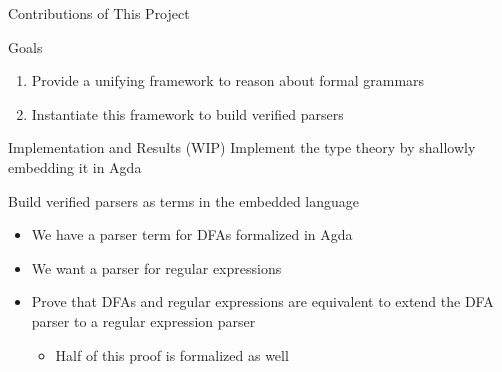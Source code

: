 \documentclass[10pt]{beamer}
\makeatletter
\newif\ifdraft
\newcommand{\todoin}[1]{\ifdraft{\todo[inline]{TODO:\@ #1}}\fi}
\makeatother
\begin{document}
\begin{frame}{Contributions of This Project}
  \begin{alertblock}{Goals}
    \begin{enumerate}
       \item<1-> Provide a unifying framework to reason about formal grammars
       \item<2-> Instantiate this framework to build verified parsers
    \end{enumerate}
  \end{alertblock}


\end{frame}

\begin{frame}{Implementation and Results (WIP)}
  Implement the type theory by shallowly embedding it in Agda

  Build verified parsers as terms in the embedded language

  \begin{itemize}
    \item<+-> We have a parser term for DFAs formalized in Agda
    \item<+-> We want a parser for regular expressions
    \item<+-> Prove that DFAs and regular expressions are equivalent to extend the DFA parser to a regular expression parser
        \begin{itemize}
            \item Half of this proof is formalized as well
        \end{itemize}
  \end{itemize}
  \todoin{Rephrase this slide to sound better}
\end{frame}
\end{document}
